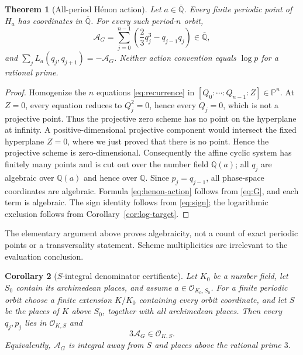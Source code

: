 \documentclass[11pt]{article}
\newtheorem{theorem}{Theorem}[section]
\newtheorem{corollary}[theorem]{Corollary}
\theoremstyle{definition}
\theoremstyle{remark}
\newcommand{\Q}{\mathbb Q}
\newcommand{\Qbar}{\overline{\mathbb Q}}
\newcommand{\Action}{\mathcal A}
\newcommand{\OKS}{\mathcal O_{K,S}}
\begin{document}
\begin{theorem}[All-period H\'enon action]
\label{thm:henon}
Let $a\in\Qbar$.  Every finite periodic point of $H_a$ has coordinates in
$\Qbar$.  For every such period-$n$ orbit,
\begin{equation}
  \Action_G
  =\sum_{j=0}^{n-1}\left(\frac23q_j^3-q_{j-1}q_j\right)
  \in\Qbar,
  \label{eq:henon-action}
\end{equation}
and $\sum_jL_a(q_j,q_{j+1})=-\Action_G$.  Neither action convention equals
$\log p$ for a rational prime.
\end{theorem}

\begin{proof}
Homogenize the $n$ equations \eqref{eq:recurrence} in
$[Q_0:\cdots:Q_{n-1}:Z]\in\mathbb P^n$.  At $Z=0$, every equation reduces
to $Q_j^2=0$, hence every $Q_j=0$, which is not a projective point.  Thus the
projective zero scheme has no point on the hyperplane at infinity.  A
  positive-dimensional projective component would intersect the fixed
  hyperplane $Z=0$, where we just proved that there is no point.  Hence the
  projective scheme is zero-dimensional.  Consequently the affine cyclic
system has finitely many points and is cut out over the number field
$\Q(a)$; all $q_j$ are algebraic over $\Q(a)$ and hence over $\Q$.  Since
$p_j=q_{j-1}$, all phase-space coordinates are algebraic.  Formula
\eqref{eq:henon-action} follows from \eqref{eq:G}, and each term is
algebraic.  The sign identity follows from \eqref{eq:sign}; the logarithmic
exclusion follows from Corollary~\ref{cor:log-target}.
\end{proof}

The elementary argument above proves algebraicity, not a count of exact
periodic points or a transversality statement.  Scheme multiplicities are
irrelevant to the evaluation conclusion.

\begin{corollary}[$S$-integral denominator certificate]
\label{cor:s-integral}
Let $K_0$ be a number field, let $S_0$ contain its archimedean places, and
assume $a\in\mathcal O_{K_0,S_0}$.  For a finite periodic orbit choose a
finite extension $K/K_0$ containing every orbit coordinate, and let $S$ be
the places of $K$ above $S_0$, together with all archimedean places.  Then
every $q_j,p_j$ lies in $\OKS$ and
\begin{equation}
  3\Action_G\in\OKS.
  \label{eq:three-action}
\end{equation}
Equivalently, $\Action_G$ is integral away from $S$ and places above the
rational prime $3$.
\end{corollary}
\end{document}

